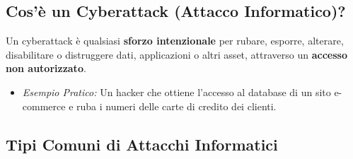 \documentclass{article}
\begin{document}
\subsection{Cos'è un Cyberattack (Attacco Informatico)?}
Un cyberattack è qualsiasi \textbf{sforzo intenzionale} per rubare, esporre, alterare, disabilitare o distruggere dati, applicazioni o altri asset, attraverso un \textbf{accesso non autorizzato}.
\begin{itemize}
    \item \textit{Esempio Pratico:} Un hacker che ottiene l'accesso al database di un sito e-commerce e ruba i numeri delle carte di credito dei clienti.
\end{itemize}

\subsection{Tipi Comuni di Attacchi Informatici}
\end{document}
